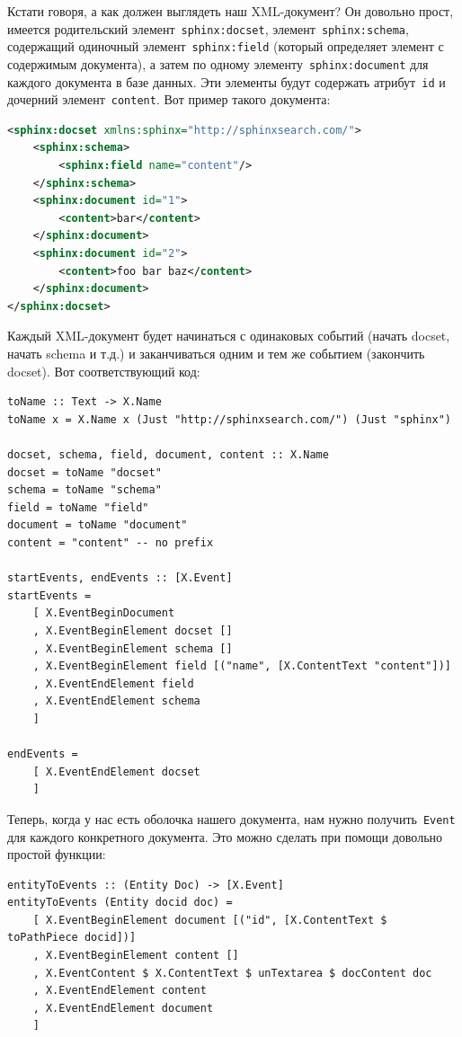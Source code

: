 Кстати говоря, а как должен выглядеть наш XML-документ? Он довольно прост,
имеется родительский элемент~\lstinline'sphinx:docset',
элемент~\lstinline'sphinx:schema', содержащий одиночный
элемент~\lstinline'sphinx:field' (который определяет элемент с содержимым
документа), а затем по одному элементу~\lstinline'sphinx:document' для каждого
документа в базе данных. Эти элементы будут содержать атрибут~\lstinline'id' и
дочерний элемент~\lstinline'content'. Вот пример такого документа:
\begin{lstlisting}[language=XML,caption=Пример xmlpipe-документа]
<sphinx:docset xmlns:sphinx="http://sphinxsearch.com/">
    <sphinx:schema>
        <sphinx:field name="content"/>
    </sphinx:schema>
    <sphinx:document id="1">
        <content>bar</content>
    </sphinx:document>
    <sphinx:document id="2">
        <content>foo bar baz</content>
    </sphinx:document>
</sphinx:docset>
\end{lstlisting}

Каждый XML-документ будет начинаться с одинаковых событий (начать docset,
начать schema и т.д.) и заканчиваться одним и тем же событием (закончить
docset). Вот соответствующий код:
\begin{lstlisting}
toName :: Text -> X.Name
toName x = X.Name x (Just "http://sphinxsearch.com/") (Just "sphinx")

docset, schema, field, document, content :: X.Name
docset = toName "docset"
schema = toName "schema"
field = toName "field"
document = toName "document"
content = "content" -- no prefix

startEvents, endEvents :: [X.Event]
startEvents =
    [ X.EventBeginDocument
    , X.EventBeginElement docset []
    , X.EventBeginElement schema []
    , X.EventBeginElement field [("name", [X.ContentText "content"])]
    , X.EventEndElement field
    , X.EventEndElement schema
    ]

endEvents =
    [ X.EventEndElement docset
    ]
\end{lstlisting}

Теперь, когда у нас есть оболочка нашего документа, нам нужно
получить~\lstinline!Event! для каждого конкретного документа. Это можно сделать
при помощи довольно простой функции:
\begin{lstlisting}
entityToEvents :: (Entity Doc) -> [X.Event]
entityToEvents (Entity docid doc) =
    [ X.EventBeginElement document [("id", [X.ContentText $ toPathPiece docid])]
    , X.EventBeginElement content []
    , X.EventContent $ X.ContentText $ unTextarea $ docContent doc
    , X.EventEndElement content
    , X.EventEndElement document
    ]
\end{lstlisting}

